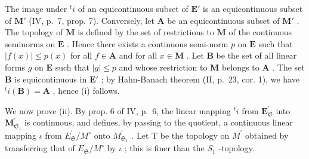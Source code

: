The image under \({}^t i\) of an equicontinuous subset of \(\mathbf{E}'\) is an equicontinuous subset of \(\mathbf{M}'\) (IV, p.~7, prop. 7). Conversely, let \(\mathbf{A}\) be an equicontinuous subset of \(\mathbf{M}'\) . The topology of \(\mathbf{M}\) is defined by the set of restrictions to \(\mathbf{M}\) of the continuous seminorms on \(\mathbf{E}\) . Hence there exists a continuous semi-norm \(p\) on \(\mathbf{E}\) such that \(|f(x)| \leqslant p(x)\) for all \(f \in \mathbf{A}\) and for all \(x \in \mathbf{M}\) . Let \(\mathbf{B}\) be the set of all linear forms \(g\) on \(\mathbf{E}\) such that \(|g| \leqslant p\) and whose restriction to \(\mathbf{M}\) belongs to \(\mathbf{A}\) . The set \(\mathbf{B}\) is equicontinuous in \(\mathbf{E}'\) ; by Hahn-Banach theorem (II, p.~23, cor. 1), we have \({}^t i(\mathbf{B}) = \mathbf{A}\) , hence (i) follows.

We now prove (ii). By prop. 6 of IV, p.~6, the linear mapping \({}^t i\) from \(\mathbf{E}_{\mathfrak{S}}^{\prime}\) into \(\mathbf{M}_{\mathfrak{S}_1}^{\prime}\) is continuous, and defines, by passing to the quotient, a continuous linear mapping \(\iota\) from \(E_{\mathfrak{S}}^{\prime}/M^{\circ}\) onto \(M_{\mathfrak{S}_{1}}^{\prime}\) . Let T be the topology on \(M^{\prime}\) obtained by transferring that of \(E_{\mathfrak{S}}^{\prime}/M^{\circ}\) by \(\iota\) ; this is finer than the \(S_{1}\) -topology.


